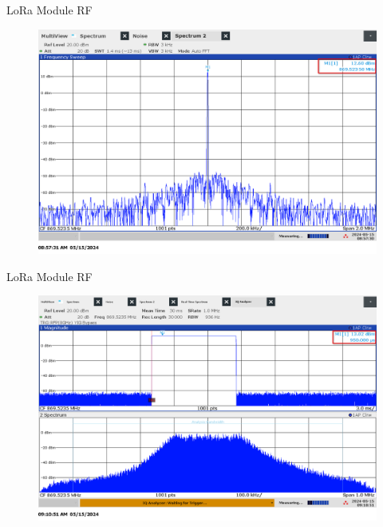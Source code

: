 \documentclass[hyphens]{beamer}
\begin{document}
\begin{frame}{LoRa Module RF}
\begin{figure}
    \centering
    \includegraphics[width=\linewidth]{../thesis/fig/rf-mask-wave.png}
\end{figure}
\end{frame}

\begin{frame}{LoRa Module RF}
\begin{figure}
    \centering
    \includegraphics[width=\linewidth]{../thesis/fig/rf-power.png}
\end{figure}
\end{frame}
\end{document}
